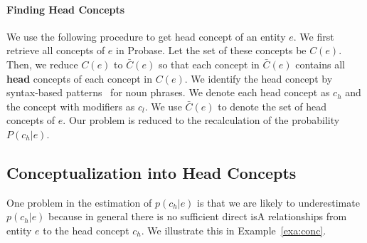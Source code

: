 \paragraph*{Finding Head Concepts}
We use the following procedure to get head concept of an entity $e$.
We first retrieve all concepts of $e$ in Probase. Let the set of these concepts be $C(e)$.
Then, we reduce $C(e)$ to $\bar{C}(e)$ so that each concept in $\bar{C}(e)$ contains all {\bf head} concepts of each concept in $C(e)$.
We identify the head concept by syntax-based patterns~\cite{ponzetto2007deriving} for noun phrases.
We denote each head concept as $c_h$ and the concept with modifiers as $c_{l}$.
We use $\bar{C}(e)$ to denote the set of head concepts of $e$.
Our problem is reduced to the recalculation of the probability $P({c_h}|e)$.


\subsection{Conceptualization into Head Concepts}
One problem in the estimation of $p(c_h|e)$ is that we are likely to underestimate $p(c_h|e)$ because in general there is no sufficient direct isA relationships from entity $e$ to the head concept $c_h$.
We illustrate this in Example~\ref{exa:conc}. 


